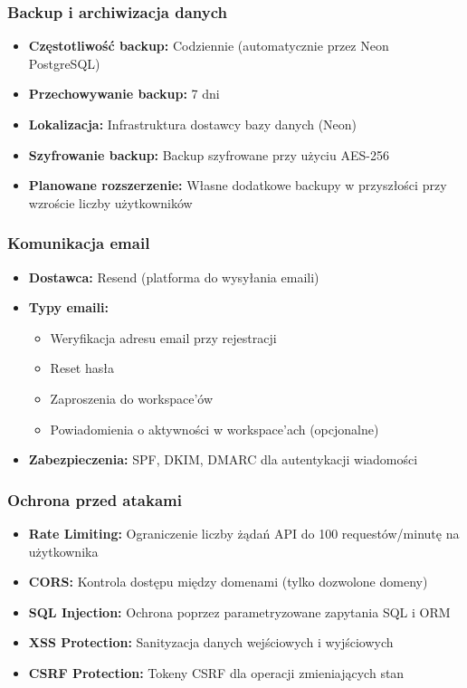 \documentclass[12pt,a4paper]{article}
\begin{document}
\subsubsection{Backup i archiwizacja danych}

\begin{itemize}[leftmargin=*]
    \item \textbf{Częstotliwość backup:} Codziennie (automatycznie przez Neon PostgreSQL)
    \item \textbf{Przechowywanie backup:} 7 dni
    \item \textbf{Lokalizacja:} Infrastruktura dostawcy bazy danych (Neon)
    \item \textbf{Szyfrowanie backup:} Backup szyfrowane przy użyciu AES-256
    \item \textbf{Planowane rozszerzenie:} Własne dodatkowe backupy w przyszłości przy wzroście liczby użytkowników
\end{itemize}

\subsubsection{Komunikacja email}

\begin{itemize}[leftmargin=*]
    \item \textbf{Dostawca:} Resend (platforma do wysyłania emaili)
    \item \textbf{Typy emaili:}
    \begin{itemize}
        \item Weryfikacja adresu email przy rejestracji
        \item Reset hasła
        \item Zaproszenia do workspace'ów
        \item Powiadomienia o aktywności w workspace'ach (opcjonalne)
    \end{itemize}
    \item \textbf{Zabezpieczenia:} SPF, DKIM, DMARC dla autentykacji wiadomości
\end{itemize}

\subsubsection{Ochrona przed atakami}

\begin{itemize}[leftmargin=*]
    \item \textbf{Rate Limiting:} Ograniczenie liczby żądań API do 100 requestów/minutę na użytkownika
    \item \textbf{CORS:} Kontrola dostępu między domenami (tylko dozwolone domeny)
    \item \textbf{SQL Injection:} Ochrona poprzez parametryzowane zapytania SQL i ORM
    \item \textbf{XSS Protection:} Sanityzacja danych wejściowych i wyjściowych
    \item \textbf{CSRF Protection:} Tokeny CSRF dla operacji zmieniających stan
\end{itemize}
\end{document}
